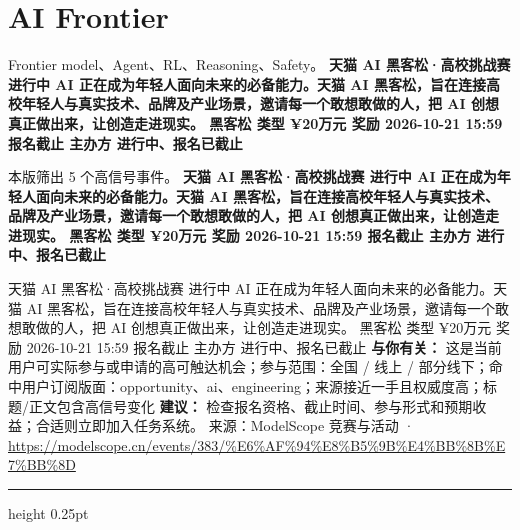 \documentclass[10.5pt]{ctexart}
\begin{document}
\section*{AI Frontier}
{\color{ormuted} Frontier model、Agent、RL、Reasoning、Safety。}
\vspace{2mm}
{\LARGE\bfseries 天猫 AI 黑客松·高校挑战赛 进行中 AI 正在成为年轻人面向未来的必备能力。天猫 AI 黑客松，旨在连接高校年轻人与真实技术、品牌及产业场景，邀请每一个敢想敢做的人，把 AI 创想真正做出来，让创造走进现实。 黑客松 类型 ¥20万元 奖励 2026-10-21 15:59 报名截止 主办方 进行中、报名已截止}\par
\vspace{1mm}
{\color{ormuted} 本版筛出 5 个高信号事件。}
\vspace{3mm}
{\Large\bfseries 天猫 AI 黑客松·高校挑战赛 进行中 AI 正在成为年轻人面向未来的必备能力。天猫 AI 黑客松，旨在连接高校年轻人与真实技术、品牌及产业场景，邀请每一个敢想敢做的人，把 AI 创想真正做出来，让创造走进现实。 黑客松 类型 ¥20万元 奖励 2026-10-21 15:59 报名截止 主办方 进行中、报名已截止}\par
天猫 AI 黑客松·高校挑战赛 进行中 AI 正在成为年轻人面向未来的必备能力。天猫 AI 黑客松，旨在连接高校年轻人与真实技术、品牌及产业场景，邀请每一个敢想敢做的人，把 AI 创想真正做出来，让创造走进现实。 黑客松 类型 ¥20万元 奖励 2026-10-21 15:59 报名截止 主办方 进行中、报名已截止
\textbf{与你有关：} 这是当前用户可实际参与或申请的高可触达机会；参与范围：全国 / 线上 / 部分线下；命中用户订阅版面：opportunity、ai、engineering；来源接近一手且权威度高；标题/正文包含高信号变化
\textbf{建议：} 检查报名资格、截止时间、参与形式和预期收益；合适则立即加入任务系统。
{\footnotesize\color{ormuted} 来源：ModelScope 竞赛与活动 · \url{https://modelscope.cn/events/383/%E6%AF%94%E8%B5%9B%E4%BB%8B%E7%BB%8D}}
\vspace{4mm}
\hrule height 0.25pt
\vspace{3mm}
\end{document}
